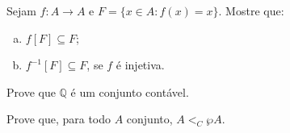\begin{exercise}
Sejam $f : A \to A$ e $F = \{x \in A : f(x) = x\}$. Mostre que:

\begin{enumerate}[a)]
\item $f[F] \subseteq F$;
\item $f^{-1}[F] \subseteq F$, se $f$ é injetiva.
\end{enumerate}
\end{exercise}

\begin{exercise}
Prove que $\mathbb Q$ é um conjunto contável.
\end{exercise}

\begin{exercise}
Prove que, para todo $A$ conjunto, $A <_C \wp A$.
\end{exercise}